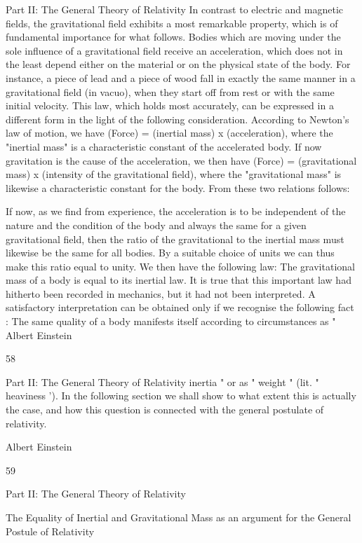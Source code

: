\documentclass{article}
\begin{document}
Part II: The General Theory of Relativity
In contrast to electric and magnetic fields, the gravitational field exhibits a most
remarkable property, which is of fundamental importance for what follows. Bodies which
are moving under the sole influence of a gravitational field receive an acceleration, which
does not in the least depend either on the material or on the physical state of the body. For
instance, a piece of lead and a piece of wood fall in exactly the same manner in a
gravitational field (in vacuo), when they start off from rest or with the same initial velocity.
This law, which holds most accurately, can be expressed in a different form in the light of
the following consideration.
According to Newton's law of motion, we have
(Force) = (inertial mass) x (acceleration),
where the "inertial mass" is a characteristic constant of the accelerated body. If now
gravitation is the cause of the acceleration, we then have
(Force) = (gravitational mass) x (intensity of the gravitational field),
where the "gravitational mass" is likewise a characteristic constant for the body. From these
two relations follows:

If now, as we find from experience, the acceleration is to be independent of the nature
and the condition of the body and always the same for a given gravitational field, then the
ratio of the gravitational to the inertial mass must likewise be the same for all bodies. By a
suitable choice of units we can thus make this ratio equal to unity. We then have the
following law: The gravitational mass of a body is equal to its inertial law.
It is true that this important law had hitherto been recorded in mechanics, but it had not
been interpreted. A satisfactory interpretation can be obtained only if we recognise the
following fact : The same quality of a body manifests itself according to circumstances as "
Albert Einstein

58

Part II: The General Theory of Relativity
inertia " or as " weight " (lit. " heaviness '). In the following section we shall show to what
extent this is actually the case, and how this question is connected with the general postulate
of relativity.

Albert Einstein

59

Part II: The General Theory of Relativity

The Equality of Inertial and
Gravitational Mass
as an argument for the General
Postule of Relativity
\end{document}
